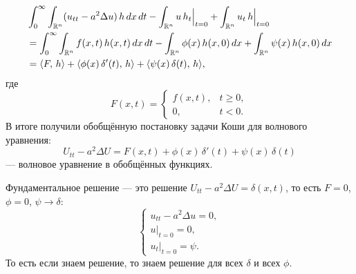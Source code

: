 \documentclass[12pt,a4paper]{article}
\begin{document}
\begin{center}
\begin{minipage}[t]{0.46\textwidth}
\centering
{}
\end{minipage}
\hfill
\begin{minipage}[t]{0.46\textwidth}
\centering
{}
\end{minipage}
\end{center}

\begin{align*}
&\int_0^\infty\int_{\mathbb{R}^n}
    (u_{tt}-a^2\Delta u)\, h\, dx\, dt
-
\int_{\mathbb{R}^n} u\, h_t\Big|_{t=0}
+
\int_{\mathbb{R}^n} u_t\, h\Big|_{t=0} \\
&=
\int_0^\infty\int_{\mathbb{R}^n}
    f(x,t)\, h(x,t)\, dx\, dt
-
\int_{\mathbb{R}^n}\phi(x)\, h(x,0)\, dx
+
\int_{\mathbb{R}^n}\psi(x)\, h(x,0)\, dx \\
&=
\langle F,\, h \rangle
+
\langle \phi(x)\, \delta'(t),\, h \rangle
+
\langle \psi(x)\, \delta(t),\, h \rangle,
\end{align*}
где
\[
F(x,t)
=
\begin{cases}
f(x,t), & t\ge 0, \\
0, & t<0.
\end{cases}
\]
В итоге получили обобщённую постановку задачи Коши
для волнового уравнения:
\[
U_{tt}-a^2\Delta U
=
F(x,t)+\phi(x)\, \delta'(t)+\psi(x)\, \delta(t)
\]
--- волновое уравнение в обобщённых функциях.

Фундаментальное решение --- это решение
\(U_{tt}-a^2\Delta U=\delta(x,t)\),
то есть \(F=0\), \(\phi=0\), \(\psi\to\delta\):
\[
\begin{cases}
u_{tt}-a^2\Delta u=0, \\
u\big|_{t=0}=0, \\
u_t\big|_{t=0}=\psi.
\end{cases}
\]
То есть если знаем решение, то знаем решение для всех \(\delta\) и всех \(\phi\).
\end{document}
